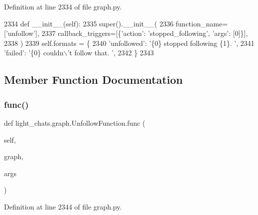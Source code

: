 Definition at line 2334 of file graph.\+py.


\begin{DoxyCode}
2334     \textcolor{keyword}{def }\_\_init\_\_(self):
2335         super().\_\_init\_\_(
2336             function\_name=[\textcolor{stringliteral}{'unfollow'}],
2337             callback\_triggers=[\{\textcolor{stringliteral}{'action'}: \textcolor{stringliteral}{'stopped\_following'}, \textcolor{stringliteral}{'args'}: [0]\}],
2338         )
2339         self.formats = \{
2340             \textcolor{stringliteral}{'unfollowed'}: \textcolor{stringliteral}{'\{0\} stopped following \{1\}. '},
2341             \textcolor{stringliteral}{'failed'}: \textcolor{stringliteral}{'\{0\} couldn\(\backslash\)'t follow that. '},
2342         \}
2343 
\end{DoxyCode}


\subsection{Member Function Documentation}
\mbox{\label{classlight__chats_1_1graph_1_1UnfollowFunction_a09b37c0a471f8dd65216e434a98983af}} 
\subsubsection{\texorpdfstring{func()}{func()}}
{\footnotesize\ttfamily def light\+\_\+chats.\+graph.\+Unfollow\+Function.\+func (\begin{DoxyParamCaption}\item[{}]{self,  }\item[{}]{graph,  }\item[{}]{args }\end{DoxyParamCaption})}



Definition at line 2344 of file graph.\+py.


